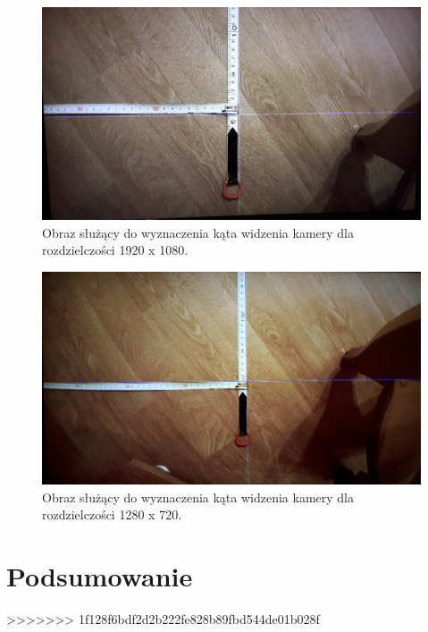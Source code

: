 \begin{figure}[h]
	\centering
	\includegraphics[width=\textwidth]{1080p.jpg}
	\caption{Obraz służący do wyznaczenia kąta widzenia kamery dla rozdzielczości 1920 x 1080.}
	\label{fig:1080p}
\end{figure}
\begin{figure}[h]
	\centering
	\includegraphics[width=\textwidth]{720p.jpg}
	\caption{Obraz służący do wyznaczenia kąta widzenia kamery dla rozdzielczości 1280 x 720.}
	\label{fig:720p}
\end{figure}



\section{Podsumowanie}






>>>>>>> 1f128f6bdf2d2b222fe828b89fbd544de01b028f
